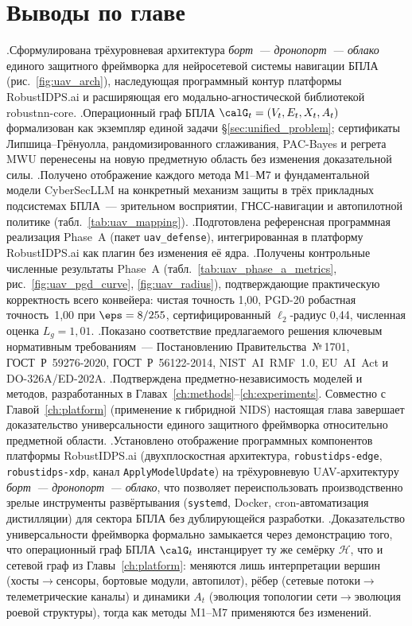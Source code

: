 \section{Выводы по главе}
\label{sec:uav_summary}
.\quad Сформулирована трёхуровневая архитектура \emph{борт~---
дронопорт~--- облако} единого защитного фреймворка для нейросетевой
системы навигации БПЛА (рис.~\ref{fig:uav_arch}), наследующая
программный контур платформы \textsf{RobustIDPS.ai} и расширяющая его
модально-агностической библиотекой \textsf{robustnn-core}.
.\quad Операционный граф БПЛА $\calG_t = (V_t,E_t,X_t,A_t)$
формализован как экземпляр единой задачи \S\ref{sec:unified_problem};
сертификаты Липшица--Грёнуолла, рандомизированного сглаживания,
PAC-Bayes и регрета MWU перенесены на новую предметную область без
изменения доказательной силы.
.\quad Получено отображение каждого метода \textsf{М1}--\textsf{М7}
и фундаментальной модели \textsf{CyberSecLLM} на конкретный механизм
защиты в трёх прикладных подсистемах БПЛА~--- зрительном восприятии,
ГНСС-навигации и автопилотной политике (табл.~\ref{tab:uav_mapping}).
.\quad Подготовлена референсная программная реализация
Phase~A (пакет \texttt{uav\_defense}), интегрированная в платформу
\textsf{RobustIDPS.ai} как плагин без изменения её ядра.
.\quad Получены контрольные численные результаты Phase~A
(табл.~\ref{tab:uav_phase_a_metrics}, рис.~\ref{fig:uav_pgd_curve},
\ref{fig:uav_radius}), подтверждающие практическую корректность всего
конвейера: чистая точность 1,00, PGD-20 робастная точность~1,00 при
$\eps=8/255$, сертифицированный $\ell_2$-радиус 0,44, численная
оценка $L_g=1{,}01$.
.\quad Показано соответствие предлагаемого решения ключевым
нормативным требованиям~--- Постановлению Правительства~№\,1701,
\mbox{ГОСТ~Р~59276-2020}, \mbox{ГОСТ~Р~56122-2014},
\mbox{NIST~AI~RMF~1.0}, \mbox{EU~AI~Act} и \mbox{DO-326A/ED-202A}.
.\quad Подтверждена предметно-независимость моделей и
методов, разработанных в Главах~\ref{ch:methods}--\ref{ch:experiments}.
Совместно с Главой~\ref{ch:platform} (применение к гибридной NIDS)
настоящая глава завершает доказательство универсальности единого
защитного фреймворка относительно предметной области.
.\quad Установлено отображение программных компонентов
платформы \textsf{RobustIDPS.ai} (двухплоскостная архитектура,
\texttt{robustidps-edge}, \texttt{robustidps-xdp}, канал
\texttt{ApplyModelUpdate}) на трёхуровневую UAV-архитектуру
\emph{борт~--- дронопорт~--- облако}, что позволяет переиспользовать
производственно зрелые инструменты развёртывания (\texttt{systemd},
Docker, cron-автоматизация дистилляции) для сектора БПЛА без
дублирующейся разработки.
.\quad Доказательство универсальности фреймворка
формально замыкается через демонстрацию того, что операционный
граф БПЛА $\calG_t$ инстанцирует ту же семёрку $\mathcal{H}$, что
и сетевой граф из Главы~\ref{ch:platform}: меняются лишь
интерпретации вершин (хосты$\to$сенсоры, бортовые модули,
автопилот), рёбер (сетевые потоки$\to$телеметрические каналы) и
динамики $A_t$ (эволюция топологии сети$\to$эволюция роевой
структуры), тогда как методы M1--M7 применяются без изменений.

